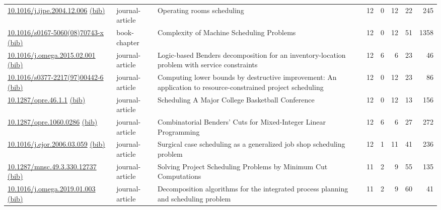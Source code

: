 {\begin{longtable}{p{5cm}lp{11cm}rrrrr}
\href{http://dx.doi.org/10.1016/j.ijpe.2004.12.006}{10.1016/j.ijpe.2004.12.006} \href{https://www.doi2bib.org/bib/10.1016/j.ijpe.2004.12.006}{(bib)} & journal-article & Operating rooms scheduling & 12 & 0 & 12 & 22 & 245 \\
\href{http://dx.doi.org/10.1016/s0167-5060(08)70743-x}{10.1016/s0167-5060(08)70743-x} \href{https://www.doi2bib.org/bib/10.1016/s0167-5060(08)70743-x}{(bib)} & book-chapter & Complexity of Machine Scheduling Problems & 12 & 0 & 12 & 51 & 1358 \\
\href{http://dx.doi.org/10.1016/j.omega.2015.02.001}{10.1016/j.omega.2015.02.001} \href{https://www.doi2bib.org/bib/10.1016/j.omega.2015.02.001}{(bib)} & journal-article & Logic-based Benders decomposition for an inventory-location problem with service constraints & 12 & 6 & 6 & 23 & 46 \\
\href{http://dx.doi.org/10.1016/s0377-2217(97)00442-6}{10.1016/s0377-2217(97)00442-6} \href{https://www.doi2bib.org/bib/10.1016/s0377-2217(97)00442-6}{(bib)} & journal-article & Computing lower bounds by destructive improvement: An application to resource-constrained project scheduling & 12 & 0 & 12 & 23 & 86 \\
\href{http://dx.doi.org/10.1287/opre.46.1.1}{10.1287/opre.46.1.1} \href{https://www.doi2bib.org/bib/10.1287/opre.46.1.1}{(bib)} & journal-article & Scheduling A Major College Basketball Conference & 12 & 0 & 12 & 13 & 156 \\
\href{http://dx.doi.org/10.1287/opre.1060.0286}{10.1287/opre.1060.0286} \href{https://www.doi2bib.org/bib/10.1287/opre.1060.0286}{(bib)} & journal-article & Combinatorial Benders' Cuts for Mixed-Integer Linear Programming & 12 & 6 & 6 & 27 & 272 \\
\href{http://dx.doi.org/10.1016/j.ejor.2006.03.059}{10.1016/j.ejor.2006.03.059} \href{https://www.doi2bib.org/bib/10.1016/j.ejor.2006.03.059}{(bib)} & journal-article & Surgical case scheduling as a generalized job shop scheduling problem & 12 & 1 & 11 & 41 & 236 \\
\href{http://dx.doi.org/10.1287/mnsc.49.3.330.12737}{10.1287/mnsc.49.3.330.12737} \href{https://www.doi2bib.org/bib/10.1287/mnsc.49.3.330.12737}{(bib)} & journal-article & Solving Project Scheduling Problems by Minimum Cut Computations & 11 & 2 & 9 & 55 & 135 \\
\href{http://dx.doi.org/10.1016/j.omega.2019.01.003}{10.1016/j.omega.2019.01.003} \href{https://www.doi2bib.org/bib/10.1016/j.omega.2019.01.003}{(bib)} & journal-article & Decomposition algorithms for the integrated process planning and scheduling problem & 11 & 2 & 9 & 60 & 41 \\

\end{longtable}}
